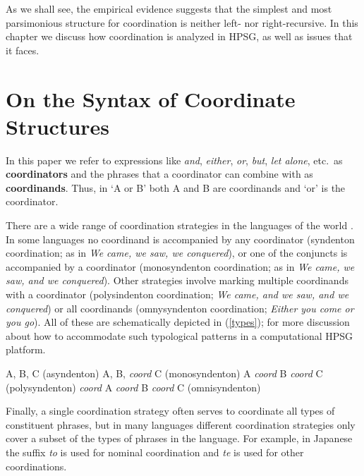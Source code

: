 \documentclass[output=paper]{langsci/langscibook}
\begin{document}
\noindent
As we shall see, the empirical evidence suggests that
the simplest and most parsimonious structure for coordination is neither left- nor right-recursive.
In this chapter we discuss how coordination is analyzed in HPSG, as well as issues that it faces.

\section{On the Syntax of Coordinate Structures}

In this paper we refer to expressions like \emph{and}, \emph{either},  \emph{or}, \emph{but}, 
\emph{let alone}, etc.\ as \textbf{coordinators} and the phrases that a coordinator can combine with as  \textbf{coordinands}.
Thus,  in `A or B' both A and B are coordinands and `or' is the coordinator. 

There are a wide range of coordination strategies in the languages of the world \citet{haspelmath}. In some languages no coordinand is accompanied by any coordinator (syndenton coordination; as in \emph{We came, we saw, we conquered}), or one of the conjuncts is accompanied by a coordinator (monosyndenton coordination; as in \emph{We came, we saw, and we conquered}). Other strategies involve marking multiple coordinands with a coordinator (polysindenton coordination;
\emph{We came, and we saw, and we conquered}) or all coordinands (omnysyndenton coordination;
\emph{Either you come or you go}).
All of these are schematically depicted in (\ref{types});
 \citet{Drellishak:Bender:05} for more discussion about how to accommodate such typological patterns in a computational HPSG platform.

\begin{exe}
\ex
\begin{xlista}
\ex A, B, C \hfill (asyndenton)
\ex A, B, \emph{coord} C \hfill (monosyndenton)
\ex A \emph{coord} B \emph{coord} C \hfill (polysyndenton)
\ex \emph{coord} A \emph{coord} B \emph{coord} C \hfill (omnisyndenton)
\end{xlista}\label{types}
\end{exe}



\noindent
 Finally, a single coordination strategy often serves to coordinate all types of constituent phrases, but in many languages different coordination strategies only cover a subset of the types of phrases in the language. For example, in
Japanese the suffix \emph{to} is used for nominal coordination
and \emph{te} is used for other coordinations.
\end{document}
